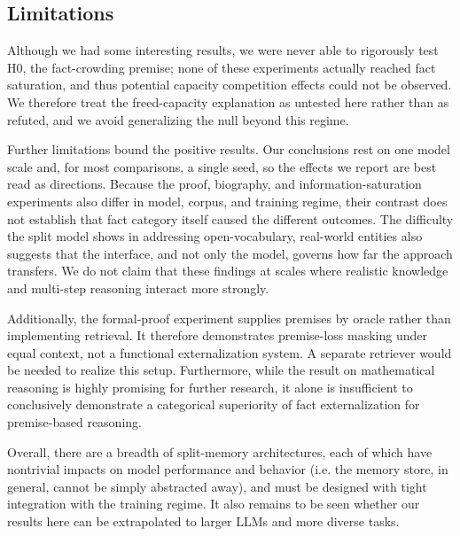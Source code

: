 \documentclass{article}
\begin{document}
\subsection{Limitations}
\label{sec:limitations}
Although we had some interesting results, we were never able to rigorously test H0, the fact-crowding premise; none of these experiments actually reached fact saturation, and thus potential capacity competition effects could not be observed. We therefore treat the freed-capacity explanation as untested here rather than as refuted, and we avoid generalizing the null beyond this regime. 

Further limitations bound the positive results. Our conclusions rest on one model scale and, for most comparisons, a single seed, so the effects we report are best read as directions. Because the proof, biography, and information-saturation experiments also differ in model, corpus, and training regime, their contrast does not establish that fact category itself caused the different outcomes. The difficulty the split model shows in addressing open-vocabulary, real-world entities also suggests that the interface, and not only the model, governs how far the approach transfers. We do not claim that these findings at scales where realistic knowledge and multi-step reasoning interact more strongly.

Additionally, the formal-proof experiment supplies premises by oracle rather than implementing retrieval. It therefore demonstrates premise-loss masking under equal context, not a functional externalization system. A separate retriever would be needed to realize this setup. Furthermore, while the result on mathematical reasoning is highly promising for further research, it alone is insufficient to conclusively demonstrate a categorical superiority of fact externalization for premise-based reasoning.

Overall, there are a breadth of split-memory architectures, each of which have nontrivial impacts on model performance and behavior (i.e. the memory store, in general, cannot be simply abstracted away), and must be designed with tight integration with the training regime. It also remains to be seen whether our results here can be extrapolated to larger LLMs and more diverse tasks.
\end{document}
